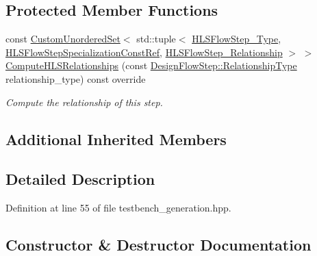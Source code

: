 \subsection*{Protected Member Functions}
\begin{DoxyCompactItemize}
\item 
const \hyperlink{classCustomUnorderedSet}{Custom\+Unordered\+Set}$<$ std\+::tuple$<$ \hyperlink{hls__step_8hpp_ada16bc22905016180e26fc7e39537f8d}{H\+L\+S\+Flow\+Step\+\_\+\+Type}, \hyperlink{hls__step_8hpp_a5fdd2edf290c196531d21d68e13f0e74}{H\+L\+S\+Flow\+Step\+Specialization\+Const\+Ref}, \hyperlink{hls__step_8hpp_a3ad360b9b11e6bf0683d5562a0ceb169}{H\+L\+S\+Flow\+Step\+\_\+\+Relationship} $>$ $>$ \hyperlink{classTestbenchGeneration_a6b4deb36d975f415b00b8ae464f4a17c}{Compute\+H\+L\+S\+Relationships} (const \hyperlink{classDesignFlowStep_a723a3baf19ff2ceb77bc13e099d0b1b7}{Design\+Flow\+Step\+::\+Relationship\+Type} relationship\+\_\+type) const override
\begin{DoxyCompactList}\small\item\em Compute the relationship of this step. \end{DoxyCompactList}\end{DoxyCompactItemize}
\subsection*{Additional Inherited Members}


\subsection{Detailed Description}


Definition at line 55 of file testbench\+\_\+generation.\+hpp.



\subsection{Constructor \& Destructor Documentation}
\mbox{\label{classTestbenchGeneration_a13107e156161753542503982023d0929}} 
